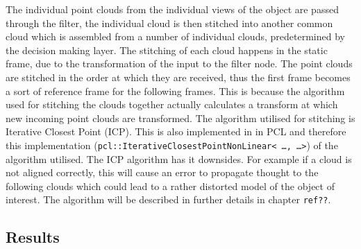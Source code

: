 The individual point clouds from the individual views of the object are passed through the filter, the individual cloud is then stitched into another common cloud which is assembled from a number of individual clouds, predetermined by the decision making layer. The stitching of each cloud happens in the static frame, due to the transformation of the input to the filter node. The point clouds are stitched in the order at which they are received, thus the first frame becomes a sort of reference frame for the following frames. This is because the algorithm used for stitching the clouds together actually calculates a transform at which new incoming point clouds are transformed. The algorithm utilised for stitching is Iterative Closest Point (ICP). This is also implemented in in PCL and therefore this implementation (\texttt{pcl::IterativeClosestPointNonLinear< \ldots , \ldots >}) of the algorithm utilised. The ICP algorithm has it downsides. For example if a cloud is not aligned correctly, this will cause an error to propagate thought to the following clouds which could lead to a rather distorted model of the object of interest\cite{choe2007registration}. The algorithm will be described in further details in chapter \texttt{ref??}.

\subsection{Results}
